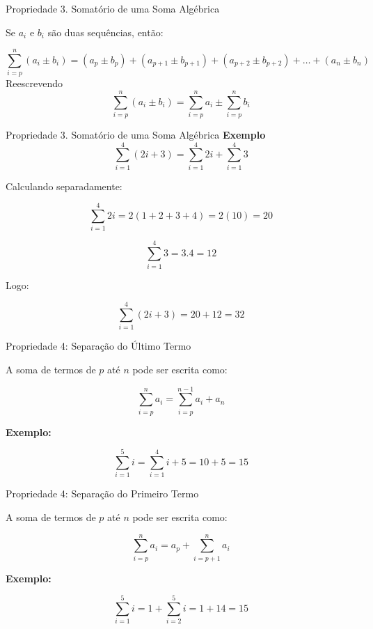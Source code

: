 \documentclass{beamer} %
\begin{document}
\begin{frame}{Propriedade 3. Somatório de uma Soma Algébrica}
	
	Se \( a_i \) e \( b_i \) são duas sequências, então:
	
	\[
	\sum_{i=p}^{n} (a_i \pm b_i) = (a_p \pm b_p) + (a_{p+1} \pm b_{p+1}) + (a_{p+2} \pm b_{p+2}) + \dots + (a_n \pm b_n)
	\]
	Reescrevendo	
	\[
	\sum_{i=p}^{n} (a_i \pm b_i) = \sum_{i=p}^{n} a_i \pm \sum_{i=p}^{n} b_i
	\]

\end{frame}

\begin{frame}{Propriedade 3. Somatório de uma Soma Algébrica}
	\textbf{Exemplo}  
	\[
	\sum_{i=1}^{4} (2i + 3) = \sum_{i=1}^{4} 2i + \sum_{i=1}^{4} 3
	\]
	
	Calculando separadamente:
	
	\[
	\sum_{i=1}^{4} 2i = 2(1+2+3+4) = 2(10) = 20
	\]
	
	\[
	\sum_{i=1}^{4} 3 = 3.4 = 12
	\]
	
	Logo:
	
	\[
	\sum_{i=1}^{4} (2i + 3) = 20 + 12 = 32
	\]
\end{frame}	
\begin{frame}{Propriedade 4: Separação do Último Termo}
	
	A soma de termos de \( p \) até \( n \) pode ser escrita como:
	
	\[
	\sum_{i=p}^{n} a_i = \sum_{i=p}^{n-1} a_i + a_n
	\]
	
	\textbf{Exemplo:}
	
	$$
	\sum_{i=1}^{5} i = \sum_{i=1}^{4} i + 5 = 10 + 5 = 15
        $$
\end{frame}
	
\begin{frame}{Propriedade 4: Separação do Primeiro Termo}
	
	A soma de termos de \( p \) até \( n \) pode ser escrita como:
	
	$$
	\sum_{i=p}^{n} a_i = a_p + \sum_{i=p+1}^{n} a_i
	$$
	
	\textbf{Exemplo:}
	
	$$
	\sum_{i=1}^{5} i = 1 + \sum_{i=2}^{5} i = 1 + 14 = 15
	$$

\end{frame}
	
	
\end{document}
